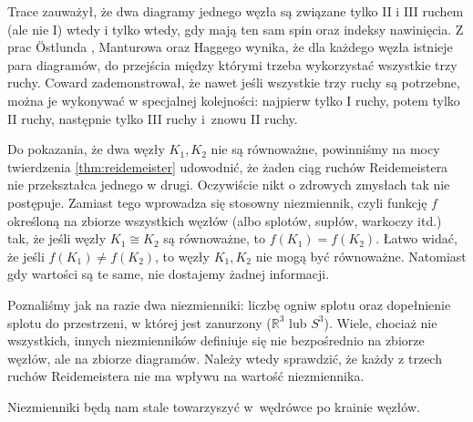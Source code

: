 Trace \cite{trace1983} zauważył, że dwa diagramy jednego węzła są związane tylko II i III ruchem (ale nie I) wtedy i tylko wtedy, gdy mają ten sam spin oraz indeksy nawinięcia.
%
Z prac Östlunda \cite{ostlund2001}, Manturowa \cite[s. ???]{manturov2004} oraz Haggego \cite{hagge2006} wynika, że dla każdego węzła istnieje para diagramów, do przejścia między którymi trzeba wykorzystać wszystkie trzy ruchy.
%
%
%
Coward \cite{coward2006} zademonstrował, że nawet jeśli wszystkie trzy ruchy są potrzebne, można je wykonywać w specjalnej kolejności: najpierw tylko I ruchy, potem tylko II ruchy, następnie tylko III ruchy i~znowu II ruchy.
%

Do pokazania, że dwa węzły $K_1, K_2$ nie są równoważne, powinniśmy na mocy twierdzenia \ref{thm:reidemeister} udowodnić, że żaden ciąg ruchów Reidemeistera nie przekształca jednego w drugi.
\label{page_first_invariant}%
Oczywiście nikt o zdrowych zmysłach tak nie postępuje.
Zamiast tego wprowadza się stosowny niezmiennik, czyli funkcję $f$ określoną na zbiorze wszystkich węzłów (albo splotów, supłów, warkoczy itd.) tak, że jeśli węzły $K_1 \cong K_2$ są równoważne, to $f(K_1) = f(K_2)$.
Łatwo widać, że jeśli $f(K_1) \neq f(K_2)$, to węzły $K_1, K_2$ nie mogą być równoważne.
Natomiast gdy wartości są te same, nie dostajemy żadnej informacji.

Poznaliśmy jak na razie dwa niezmienniki: liczbę ogniw splotu oraz dopełnienie splotu do przestrzeni, w której jest zanurzony ($\mathbb R^3$ lub $S^3$).
Wiele, chociaż nie wszystkich, innych niezmienników definiuje się nie bezpośrednio na zbiorze węzłów, ale na zbiorze diagramów.
Należy wtedy sprawdzić, że każdy z trzech ruchów Reidemeistera nie ma wpływu na wartość niezmiennika.

Niezmienniki będą nam stale towarzyszyć w~wędrówce po krainie węzłów.

